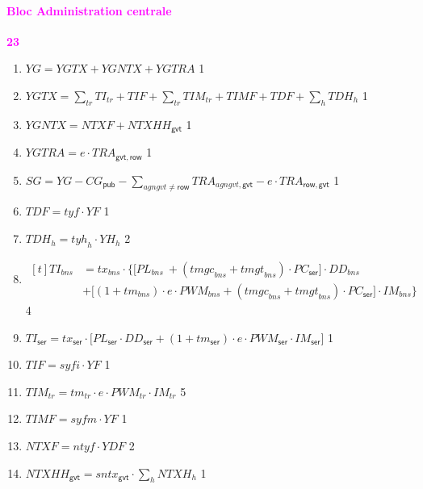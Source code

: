 \documentclass[11pt,a4paper]{article}
\newcommand{\agngvt}{\mathit{agngvt}}
\newcommand{\ntyf}{\mathit{ntyf}}
\newcommand{\gvt}{\mathsf{gvt}}
\newcommand{\row}{\mathsf{row}}
\newcommand{\YDF}{\mathit{YDF}}
\newcommand{\bns}{\mathit{bns}}
\newcommand{\CG}{\mathit{CG}}
\newcommand{\DD}{\mathit{DD}}
\newcommand{\sntx}{\mathit{sntx}}
\newcommand{\IM}{\mathit{IM}}
\newcommand{\NTXHH}{\mathit{NTXHH}}
\newcommand{\ser}{\mathsf{ser}}
\newcommand{\SG}{\mathit{SG}}
\newcommand{\TI}{\mathit{TI}}
\newcommand{\TIF}{\mathit{TIF}}
\newcommand{\TIM}{\mathit{TIM}}
\newcommand{\TIMF}{\mathit{TIMF}}
\newcommand{\PC}{\mathit{PC}}
\newcommand{\PL}{\mathit{PL}}
\newcommand{\TRA}{\mathit{TRA}}
\newcommand{\PWM}{\mathit{PWM}}
\newcommand{\pub}{\mathsf{pub}}
\newcommand{\TR}{\mathit{TRA}}
\newcommand{\syfi}{\mathit{syfi}}
\newcommand{\syfm}{\mathit{syfm}}
\newcommand{\tr}{\mathit{tr}}
\newcommand{\tx}{\mathit{tx}}
\newcommand{\tm}{\mathit{tm}}
\newcommand{\tmgc}{\mathit{tmgc}}
\newcommand{\tmgt}{\mathit{tmgt}}
\newcommand{\tyh}{\mathit{tyh}}
\newcommand{\tyf}{\mathit{tyf}}
\newcommand{\NTXF}{\mathit{NTXF}}
\newcommand{\NTXH}{\mathit{NTXH}}
\newcommand{\TDH}{\mathit{TDH}}
\newcommand{\TDF}{\mathit{TDF}}
\newcommand{\YH}{\mathit{YH}}
\newcommand{\YF}{\mathit{YF}}
\newcommand{\YG}{\mathit{YG}}
\newcommand{\YGTX}{\mathit{YGTX}}
\newcommand{\YGNTX}{\mathit{YGNTX}}
\newcommand{\YGTR}{\mathit{YGTRA}}
\newcommand{\redparagraph}[1]{\paragraph*{\large\textcolor{Fuchsia}{#1}}}
\begin{document}
	
	\redparagraph{Bloc Administration centrale}\hfill \textcolor{Fuchsia}{\textbf{23}}
	\begin{enumerate}[itemsep=2pt,label=\textbf{eq\arabic*}.,resume]
		
		\item $\YG = \YGTX + \YGNTX + \YGTR$   \hfill 1 
		
		\item $\YGTX = \sum_{\tr}\TI_{\tr} + \TIF + \sum_{\tr}\TIM_{\tr} + \TIMF + \TDF + \sum_{h} \TDH_h $ \hfill 1
		
		\item $\YGNTX = \NTXF + \NTXHH_{\gvt}$   \hfill 1 
		
		\item $\YGTR = e\cdot\TRA_{\gvt, \row} $ \hfill 1
		
		\item $\SG = \YG - \CG_{\pub}  - \sum_{\agngvt\neq\row} \TR_{\agngvt,\gvt} - e\cdot\TR_{\row,\gvt}$ \hfill 1
		
		\item $\TDF = \tyf\cdot\YF$ \hfill 1
		
		\item $\TDH_h  = \tyh_h\cdot\YH_h$ \hfill 2
		
		\item $\begin{aligned}[t]
			\TI_{\bns} &= \tx_{\bns}\cdot \Bigg\{\Big[\PL_{\bns}\ +\left(\tmgc_{\bns} + \tmgt_{\bns}\right)\cdot\PC_{\ser}\Big]\cdot\DD_{\bns}\\
			& + \Big[(1 + \tm_{\bns})\cdot e \cdot \PWM_{\bns} +\left(\tmgc_{\bns} + \tmgt_{\bns}\right)\cdot\PC_{\ser} \Big]\cdot\IM_{\bns} \Bigg\} 
		\end{aligned}$ \hfill 4
		
		\item $\TI_{\ser} = \tx_{\ser}\cdot \Big[\PL_{\ser}\cdot\DD_{\ser} + (1 + \tm_{\ser})\cdot e \cdot \PWM_{\ser}\cdot\IM_{\ser} \Big]$ \hfill 1
		
		\item $\TIF = \syfi\cdot\YF$ \label{it:TIF}  \hfill 1
		
		\item $\TIM_{\tr} = \tm_{\tr} \cdot e \cdot \PWM_{\tr}\cdot\IM_{\tr}$ \hfill 5
		
		\item $\TIMF = \syfm\cdot\YF$  \label{it:TIM}\hfill 1		
		\item $\NTXF = \ntyf \cdot\YDF$ \label{it:TRAGVTf} \hfill 2
		
		
		
		\item  $\NTXHH_{\gvt} = \sntx_{\gvt} \cdot \sum_{h}\NTXH_h$  \hfill 1
	\end{enumerate}
	
\end{document}
